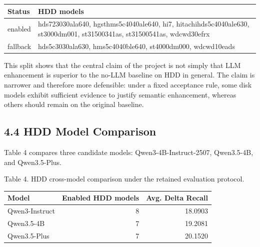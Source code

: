 \documentclass[
  11pt,
  a4paper]{article}
\begin{document}
\begin{longtable}[]{@{}ll@{}}
\toprule
\begin{minipage}[b]{0.47\columnwidth}\raggedright
Status\strut
\end{minipage} & \begin{minipage}[b]{0.47\columnwidth}\raggedright
HDD models\strut
\end{minipage}\tabularnewline
\midrule
\endhead
\begin{minipage}[t]{0.47\columnwidth}\raggedright
enabled\strut
\end{minipage} & \begin{minipage}[t]{0.47\columnwidth}\raggedright
hds723030ala640, hgsthms5c4040ale640, hi7, hitachihds5c4040ale630,
st3000dm001, st31500341as, st31500541as, wdcwd30efrx\strut
\end{minipage}\tabularnewline
\begin{minipage}[t]{0.47\columnwidth}\raggedright
fallback\strut
\end{minipage} & \begin{minipage}[t]{0.47\columnwidth}\raggedright
hds5c3030ala630, hms5c4040ble640, st4000dm000, wdcwd10eads\strut
\end{minipage}\tabularnewline
\bottomrule
\end{longtable}

This split shows that the central claim of the project is not simply
that LLM enhancement is superior to the no-LLM baseline on HDD in
general. The claim is narrower and therefore more defensible: under a
fixed acceptance rule, some disk models exhibit sufficient evidence to
justify semantic enhancement, whereas others should remain on the
original baseline.

\hypertarget{hdd-model-comparison}{%
\subsection{4.4 HDD Model Comparison}\label{hdd-model-comparison}}

Table 4 compares three candidate models: Qwen3-4B-Instruct-2507,
Qwen3.5-4B, and Qwen3.5-Plus.

Table 4. HDD cross-model comparison under the retained evaluation
protocol.

\begin{longtable}[]{@{}lrr@{}}
\toprule
Model & Enabled HDD models & Avg. Delta Recall\tabularnewline
\midrule
\endhead
Qwen3-Instruct & 8 & 18.0903\tabularnewline
Qwen3.5-4B & 7 & 19.2081\tabularnewline
Qwen3.5-Plus & 7 & 20.1520\tabularnewline
\bottomrule
\end{longtable}
\end{document}
